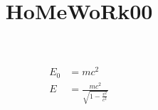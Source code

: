 \documentclass[12pt]{article}
\title{HoMeWoRk00}
\date{}
\begin{document}
  \maketitle
  \begin{align}
    E_0 &= mc^2                              \\
    E &= \frac{mc^2}{\sqrt{1-\frac{v^2}{c^2}}}
  \end{align}
\end{document}
